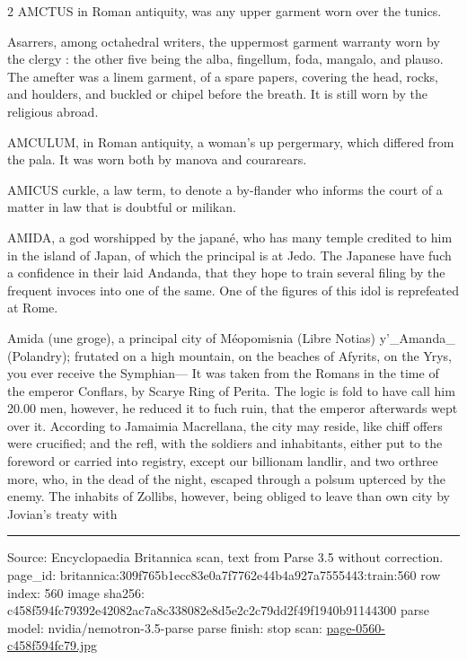 \documentclass[10pt]{article}
\begin{document}
\begin{multicols}{2}
AMCTUS in Roman antiquity, was any upper garment worn over the tunics.

Asarrers, among octahedral writers, the uppermost garment warranty worn by the clergy : the other five being the alba, fingellum, foda, mangalo, and plauso. The amefter was a linem garment, of a spare papers, covering the head, rocks, and houlders, and buckled or chipel before the breath. It is still worn by the religious abroad.

AMCULUM, in Roman antiquity, a woman’s up pergermary, which differed from the pala. It was worn both by manova and courarears.

AMICUS curkle, a law term, to denote a by-flander who informs the court of a matter in law that is doubtful or milikan.

AMIDA, a god worshipped by the japané, who has many temple credited to him in the island of Japan, of which the principal is at Jedo. The Japanese have fuch a confidence in their laid Andanda, that they hope to train several filing by the frequent invoces into one of the same. One of the figures of this idol is reprefeated at Rome.

Amida (une groge), a principal city of Méopomisnia (Libre Notias) y'\_Amanda\_ (Polandry); frutated on a high mountain, on the beaches of Afyrits, on the Yrys, you ever receive the Symphian— It was taken from the Romans in the time of the emperor Conflars, by Scarye Ring of Perita. The logic is fold to have call him 20.00 men, however, he reduced it to fuch ruin, that the emperor afterwards wept over it. According to Jamaimia Macrellana, the city may reside, like chiff offers were crucified; and the refl, with the soldiers and inhabitants, either put to the foreword or carried into registry, except our billionam landlir, and two orthree more, who, in the dead of the night, escaped through a polsum upterced by the enemy. The inhabits of Zollibs, however, being obliged to leave than own city by Jovian’s treaty with

\end{multicols}
\vfill\par\noindent\rule{\linewidth}{0.4pt}\par
{\scriptsize\color{gray}\noindent Source: Encyclopaedia Britannica scan, text from Parse 3.5 without correction. page\_id: britannica:309f765b1ecc83e0a7f7762e44b4a927a7555443:train:560 \quad row index: 560 \quad image sha256: c458f594fc79392e42082ac7a8c338082e8d5e2c2c79dd2f49f1940b91144300 \quad parse model: nvidia/nemotron-3.5-parse \quad parse finish: stop \quad scan: \href{../scans/page-0560-c458f594fc79.jpg}{page-0560-c458f594fc79.jpg}\par}
\end{document}
